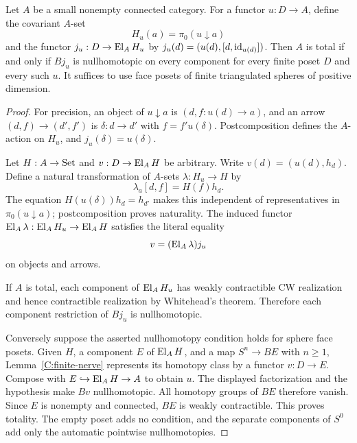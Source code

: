 \begin{proposition}
\label{C:lead6}
Let $A$ be a small nonempty connected category. For a functor
$u:D\to A$, define the covariant $A$-set
\[
 H_u(a)=\pi_0(u\downarrow a)
\]
and the functor $j_u:D\to\operatorname{El}_AH_u$ by
$j_u(d)=(u(d),[d,\operatorname{id}_{u(d)}])$. Then $A$ is total if and only if
$Bj_u$ is nullhomotopic on every component for every finite poset
$D$ and every such $u$. It suffices to use face posets of finite
triangulated spheres of positive dimension.
\end{proposition}
\begin{proof}
For precision, an object of $u\downarrow a$ is $(d,f:u(d)\to a)$,
and an arrow $(d,f)\to(d',f')$ is $\delta:d\to d'$ with
$f=f'u(\delta)$. Postcomposition defines the $A$-action on $H_u$,
and $j_u(\delta)=u(\delta)$.

Let $H:A\to\mathrm{Set}$ and $v:D\to\operatorname{El}_AH$ be arbitrary. Write
$v(d)=(u(d),h_d)$. Define a natural transformation of $A$-sets
$\lambda:H_u\to H$ by
\[
 \lambda_a[d,f]=H(f)h_d.
\]
The equation $H(u(\delta))h_d=h_{d'}$ makes this independent of
representatives in $\pi_0(u\downarrow a)$; postcomposition proves
naturality. The induced functor
$\operatorname{El}_A\lambda:\operatorname{El}_AH_u\to\operatorname{El}_AH$ satisfies the literal equality
\[
 v=(\operatorname{El}_A\lambda)j_u
\]
on objects and arrows.

If $A$ is total, each component of $\operatorname{El}_AH_u$ has weakly
contractible CW realization and hence contractible realization by
Whitehead's theorem. Therefore each component restriction of $Bj_u$
is nullhomotopic.

Conversely suppose the asserted nullhomotopy condition holds for
sphere face posets. Given $H$, a component $E$ of $\operatorname{El}_AH$, and a
map $S^n\to BE$ with $n\geq1$, Lemma~\ref{C:finite-nerve}
represents its homotopy class by a functor $v:D\to E$. Compose
with $E\hookrightarrow\operatorname{El}_AH\to A$ to obtain $u$. The displayed
factorization and the hypothesis make $Bv$ nullhomotopic. All
homotopy groups of $BE$ therefore vanish. Since $E$ is nonempty
and connected, $BE$ is weakly contractible. This proves totality.
The empty poset adds no condition, and the separate components of
$S^0$ add only the automatic pointwise nullhomotopies.
\end{proof}

